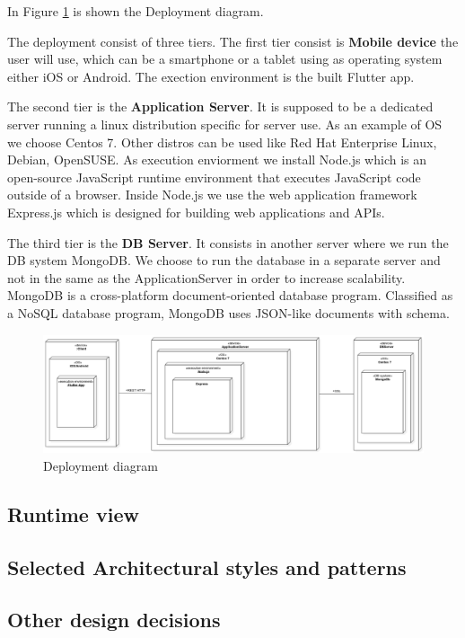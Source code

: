 In Figure \ref{fig:deploy} is shown the Deployment diagram.

The deployment consist of three tiers. The first tier consist is \textbf{Mobile device} the user will use, which can be a smartphone or a tablet using as operating system either iOS or Android.
The exection environment is the built Flutter app.


The second tier is the \textbf{Application Server}. It is supposed to be a dedicated server running a linux distribution specific for server use. As an example of OS we choose Centos 7. Other distros can be used like Red Hat Enterprise Linux, Debian, OpenSUSE.
As execution enviorment we install Node.js which is an open-source JavaScript runtime environment that executes JavaScript code outside of a browser. Inside Node.js we use the web application framework Express.js which is designed for building web applications and APIs.


The third tier is the \textbf{DB Server}. It consists in another server where we run the DB system MongoDB. We choose to run the database in a separate server and not in the same as the ApplicationServer in order to increase scalability. MongoDB is a cross-platform document-oriented database program. Classified as a NoSQL database program, MongoDB uses JSON-like documents with schema.



\begin{figure}
\centering
\includegraphics[width=\textwidth]{Images/DeploymentDiagram1.png}
\caption{\label{fig:deploy} Deployment diagram}
\end{figure}



\subsection{Runtime view}

\subsection{Selected Architectural styles and patterns}



\subsection{Other design decisions}
